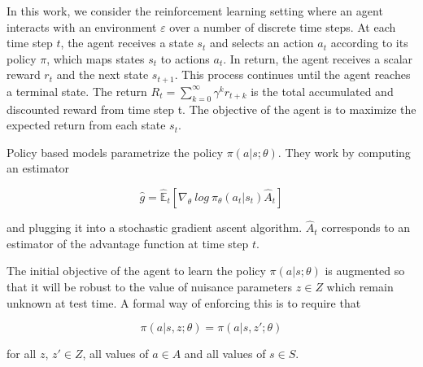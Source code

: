 \documentclass{article}
\begin{document}
In this work, we consider the reinforcement learning setting where an agent interacts with an environment $\varepsilon$ over a number of discrete time steps. At each time step $t$, the agent receives a state $s_t$ and selects an action $a_t$ according to its policy $\pi$, which maps states $s_t$ to actions $a_t$. In return, the agent receives a scalar reward $r_t $ and the next state $s_{t+1}$. This process continues until the agent reaches a terminal state. The return $R_t = \sum_{k=0}^{\infty}\gamma^k r_{t+k}$ is the total accumulated and discounted reward from time step t. The objective of the agent is to maximize the expected return from each state $s_t$.

Policy based models parametrize the policy $\pi (a | s; \theta)$. They work by computing an estimator

\begin{equation}
	\hat{g} = \hat{\mathbb{E}}_t [\nabla_\theta \ log\ \pi_\theta(a_t | s_t) \hat{A}_t]
\end{equation}

and plugging it into a stochastic gradient ascent algorithm. $\hat{A}_t$ corresponds to an estimator of the advantage function at time step $t$.

The initial objective of the agent to learn the policy $\pi (a | s; \theta)$ is augmented so that it will be robust to the value of nuisance parameters $z \in Z$ which remain unknown at test time. A formal way of enforcing this is to require that

\begin{equation}
	\pi (a | s, z; \theta) = \pi (a | s, z'; \theta)
\end{equation}

for all $z$, $z' \in Z$, all values of $a \in A$ and all values of $s \in S$.
\end{document}
